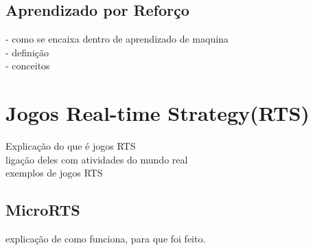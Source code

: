 \subsection{Aprendizado por Reforço} 
- como se encaixa dentro de aprendizado de maquina \\
- definição \\
- conceitos

\section{Jogos Real-time Strategy(RTS)} 
Explicação do que é jogos RTS \\
ligação deles com atividades do mundo real \\
exemplos de jogos RTS 

\subsection{MicroRTS} 
explicação de como funciona, para que foi feito. 

